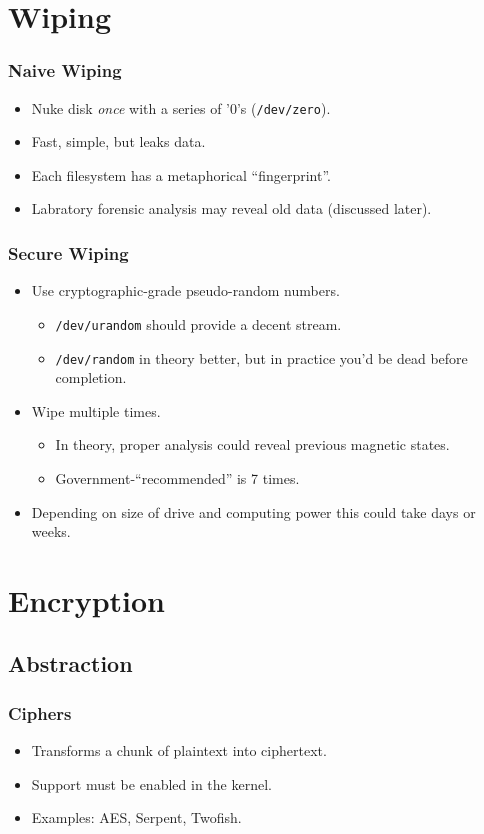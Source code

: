 \documentclass[xcolor={dvipsnames,svgnames},hyperref=dvips]{beamer}
\begin{document}
\section{Wiping}\label{wiping}
	\begin{frame}
		\frametitle{Naive Wiping}
		\begin{itemize}
		\item Nuke disk \textit{once} with a series of '0's (\texttt{/dev/zero}).
		\item Fast, simple, but leaks data.
		\item Each filesystem has a metaphorical ``fingerprint''.
		\item Labratory forensic analysis may reveal old data (discussed later).
		\end{itemize}
	\end{frame}

	\begin{frame}
		\frametitle{Secure Wiping}
		\begin{itemize}
		\item Use cryptographic-grade pseudo-random numbers.
			\begin{itemize}
			\item \texttt{/dev/urandom} should provide a decent stream.
			\item \texttt{/dev/random} in theory better, but in practice you'd be dead before completion.
			\end{itemize}
		\item Wipe multiple times.
			\begin{itemize}
			\item In theory, proper analysis could reveal previous magnetic states.
			\item Government-``recommended'' is 7 times.
			\end{itemize}
		\item Depending on size of drive and computing power this could take days or weeks.
		\end{itemize}
	\end{frame}

\section{Encryption}\label{section:encryption}
	\subsection{Abstraction}
	\begin{frame}
		\frametitle{Ciphers}
		\begin{itemize}
		\item Transforms a chunk of plaintext into ciphertext.
		\item Support must be enabled in the kernel.
		\item Examples: AES, Serpent, Twofish.
		\end{itemize}
	\end{frame}
\end{document}
